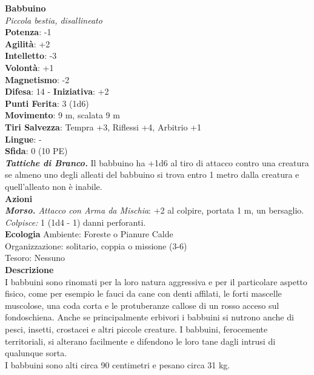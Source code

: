 \begin{multicols}{2}
\medskip\textbf{Babbuino}\\
\emph{Piccola bestia, disallineato}\\
\textbf{Potenza}: -1\\
\textbf{Agilità}: +2\\
\textbf{Intelletto}: -3\\
\textbf{Volontà}: +1\\
\textbf{Magnetismo}: -2\\
\textbf{Difesa}: 14 - \textbf{Iniziativa}: +2\\
\textbf{Punti Ferita}: 3 (1d6)\\
\textbf{Movimento}: 9 m, scalata 9 m\\
\textbf{Tiri Salvezza}: Tempra +3, Riflessi +4, Arbitrio +1\\
\textbf{Lingue}: -\\
\textbf{Sfida}: 0 (10 PE)\smallskip\\
\emph{\textbf{Tattiche di Branco.}} Il babbuino ha +1d6 al tiro di attacco contro una creatura se almeno uno degli alleati del babbuino si trova entro 1 metro dalla creatura e quell'alleato non è inabile.\\
\smallskip\textbf{Azioni}\\
\emph{\textbf{Morso.} Attacco con Arma da Mischia}: +2 al colpire, portata 1 m, un bersaglio.\\
\emph{Colpisce:} 1 (1d4 - 1) danni perforanti.\\
\textbf{Ecologia}
Ambiente: Foreste o Pianure Calde\\
Organizzazione: solitario, coppia o missione (3-6)\\
Tesoro: Nessuno\\
\textbf{Descrizione}\\
I babbuini sono rinomati per la loro natura aggressiva e per il particolare aspetto fisico, come per esempio le fauci da cane con denti affilati, le forti mascelle muscolose, una coda corta e le protuberanze callose di un rosso acceso sul fondoschiena. Anche se principalmente erbivori i babbuini si nutrono anche di pesci, insetti, crostacei e altri piccole creature. I babbuini, ferocemente territoriali, si alterano facilmente e difendono le loro tane dagli intrusi di qualunque sorta.\\

I babbuini sono alti circa 90 centimetri e pesano circa 31 kg.\\


\end{multicols}
